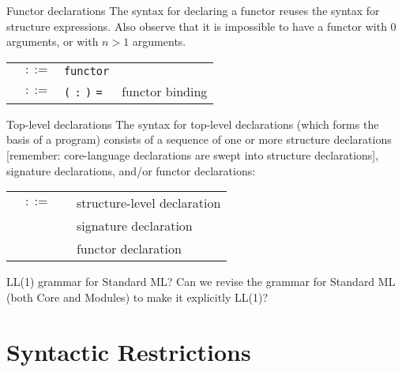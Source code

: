 \begin{grammar}{Functor declarations}
The syntax for declaring a functor reuses the syntax for structure
expressions. Also observe that it is impossible to have a functor with
$0$ arguments, or with $n>1$ arguments.
\begin{longtable}{rcll}
\label{grammar:fundec}\nonterminal{fund} & $::=$ & \texttt{functor} \nonterminal{funbind} & \\
\label{grammar:funbind}\nonterminal{funbind} & $::=$ &
\nonterminal{funid} \texttt{(}\nonterminal{strid} \texttt{:} \nonterminal{sigexp}\texttt{)} \texttt{=} \hyperref[grammar:strexp]{\nonterminal{strexp}}
\optional{\texttt{and} \nonterminal{funbind}}
& functor binding\\
\end{longtable}
\end{grammar}

\begin{grammar}{Top-level declarations}
The syntax for top-level declarations (which forms the basis of a
program) consists of a sequence of one or more structure declarations
[remember: core-language declarations are swept into structure declarations],
signature declarations, and/or functor declarations:
\begin{longtable}{rcll}
  \label{grammar:topdec}\nonterminal{topdec} & $::=$ &
\hyperref[grammar:strdec]{\nonterminal{strdec}} \optional{\nonterminal{topdec}} & structure-level declaration \\
&\alt& \hyperref[grammar:sigdec]{\nonterminal{sigdec}} \optional{\nonterminal{topdec}} & signature declaration \\
&\alt& \hyperref[grammar:fundec]{\nonterminal{fundec}} \optional{\nonterminal{topdec}} & functor declaration \\
\end{longtable}
\end{grammar}

\begin{puzzle}{LL(1) grammar for Standard ML?}
Can we revise the grammar for Standard ML (both Core and Modules) to
make it explicitly LL(1)?
\end{puzzle}

\section{Syntactic Restrictions}

